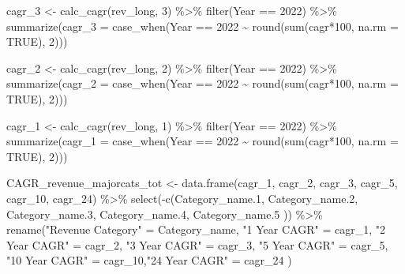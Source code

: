 \documentclass[
  letterpaper,
  DIV=11,
  numbers=noendperiod]{scrreport}
\newenvironment{Shaded}{\begin{snugshade}}{\end{snugshade}}
\newcommand{\AttributeTok}[1]{\textcolor[rgb]{0.40,0.45,0.13}{#1}}
\newcommand{\ConstantTok}[1]{\textcolor[rgb]{0.56,0.35,0.01}{#1}}
\newcommand{\DecValTok}[1]{\textcolor[rgb]{0.68,0.00,0.00}{#1}}
\newcommand{\FloatTok}[1]{\textcolor[rgb]{0.68,0.00,0.00}{#1}}
\newcommand{\FunctionTok}[1]{\textcolor[rgb]{0.28,0.35,0.67}{#1}}
\newcommand{\NormalTok}[1]{\textcolor[rgb]{0.00,0.23,0.31}{#1}}
\newcommand{\OtherTok}[1]{\textcolor[rgb]{0.00,0.23,0.31}{#1}}
\newcommand{\SpecialCharTok}[1]{\textcolor[rgb]{0.37,0.37,0.37}{#1}}
\newcommand{\StringTok}[1]{\textcolor[rgb]{0.13,0.47,0.30}{#1}}
\begin{document}
\begin{Shaded}
\begin{Highlighting}[]
\NormalTok{cagr\_3 }\OtherTok{\textless{}{-}} \FunctionTok{calc\_cagr}\NormalTok{(rev\_long, }\DecValTok{3}\NormalTok{) }\SpecialCharTok{\%\textgreater{}\%} 
  \FunctionTok{filter}\NormalTok{(Year }\SpecialCharTok{==} \DecValTok{2022}\NormalTok{) }\SpecialCharTok{\%\textgreater{}\%}
  \FunctionTok{summarize}\NormalTok{(}\AttributeTok{cagr\_3 =} \FunctionTok{case\_when}\NormalTok{(Year }\SpecialCharTok{==} \DecValTok{2022} \SpecialCharTok{\textasciitilde{}} \FunctionTok{round}\NormalTok{(}\FunctionTok{sum}\NormalTok{(cagr}\SpecialCharTok{*}\DecValTok{100}\NormalTok{, }\AttributeTok{na.rm =} \ConstantTok{TRUE}\NormalTok{), }\DecValTok{2}\NormalTok{)))}

\NormalTok{cagr\_2 }\OtherTok{\textless{}{-}} \FunctionTok{calc\_cagr}\NormalTok{(rev\_long, }\DecValTok{2}\NormalTok{) }\SpecialCharTok{\%\textgreater{}\%} 
  \FunctionTok{filter}\NormalTok{(Year }\SpecialCharTok{==} \DecValTok{2022}\NormalTok{) }\SpecialCharTok{\%\textgreater{}\%}
  \FunctionTok{summarize}\NormalTok{(}\AttributeTok{cagr\_2 =} \FunctionTok{case\_when}\NormalTok{(Year }\SpecialCharTok{==} \DecValTok{2022} \SpecialCharTok{\textasciitilde{}} \FunctionTok{round}\NormalTok{(}\FunctionTok{sum}\NormalTok{(cagr}\SpecialCharTok{*}\DecValTok{100}\NormalTok{, }\AttributeTok{na.rm =} \ConstantTok{TRUE}\NormalTok{), }\DecValTok{2}\NormalTok{)))}

\NormalTok{ cagr\_1 }\OtherTok{\textless{}{-}} \FunctionTok{calc\_cagr}\NormalTok{(rev\_long, }\DecValTok{1}\NormalTok{) }\SpecialCharTok{\%\textgreater{}\%} 
  \FunctionTok{filter}\NormalTok{(Year }\SpecialCharTok{==} \DecValTok{2022}\NormalTok{) }\SpecialCharTok{\%\textgreater{}\%}
  \FunctionTok{summarize}\NormalTok{(}\AttributeTok{cagr\_1 =} \FunctionTok{case\_when}\NormalTok{(Year }\SpecialCharTok{==} \DecValTok{2022} \SpecialCharTok{\textasciitilde{}} \FunctionTok{round}\NormalTok{(}\FunctionTok{sum}\NormalTok{(cagr}\SpecialCharTok{*}\DecValTok{100}\NormalTok{, }\AttributeTok{na.rm =} \ConstantTok{TRUE}\NormalTok{), }\DecValTok{2}\NormalTok{)))}

\NormalTok{CAGR\_revenue\_majorcats\_tot }\OtherTok{\textless{}{-}} \FunctionTok{data.frame}\NormalTok{(cagr\_1, cagr\_2, cagr\_3, cagr\_5, cagr\_10, cagr\_24) }\SpecialCharTok{\%\textgreater{}\%}   
  \FunctionTok{select}\NormalTok{(}\SpecialCharTok{{-}}\FunctionTok{c}\NormalTok{(Category\_name}\FloatTok{.1}\NormalTok{, Category\_name}\FloatTok{.2}\NormalTok{, Category\_name}\FloatTok{.3}\NormalTok{, Category\_name}\FloatTok{.4}\NormalTok{, Category\_name}\FloatTok{.5}\NormalTok{ )) }\SpecialCharTok{\%\textgreater{}\%} 
  \FunctionTok{rename}\NormalTok{(}\StringTok{"Revenue Category"} \OtherTok{=}\NormalTok{ Category\_name, }\StringTok{"1 Year CAGR"} \OtherTok{=}\NormalTok{ cagr\_1, }\StringTok{"2 Year CAGR"} \OtherTok{=}\NormalTok{ cagr\_2, }\StringTok{"3 Year CAGR"} \OtherTok{=}\NormalTok{ cagr\_3, }\StringTok{"5 Year CAGR"} \OtherTok{=}\NormalTok{ cagr\_5, }\StringTok{"10 Year CAGR"} \OtherTok{=}\NormalTok{ cagr\_10,}\StringTok{"24 Year CAGR"} \OtherTok{=}\NormalTok{ cagr\_24 )}


\end{Highlighting}
\end{Shaded}
\end{document}
